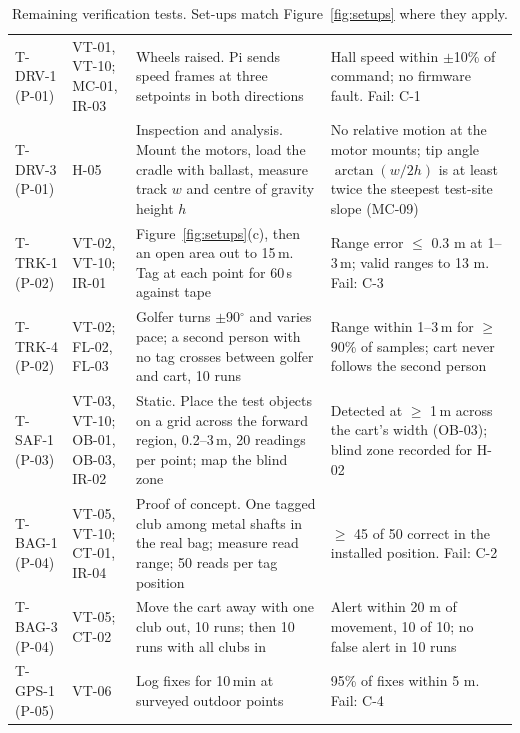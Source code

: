 \begin{table}[H]
\centering
\caption{Remaining verification tests. Set-ups match Figure~\ref{fig:setups} where they apply.}
\label{tab:tests-appendix}
\footnotesize\renewcommand{\arraystretch}{1.0}
\begin{tabularx}{\linewidth}{@{}L{0.56in} L{0.72in} Y Y@{}}
\toprule
{} &  &  &  \\
\midrule
\mbox{T-DRV-1} (P-01) & VT-01, VT-10; MC-01, IR-03 & Wheels raised. Pi sends speed frames at three setpoints in both directions & Hall speed within $\pm$10\% of command; no firmware fault. Fail: C-1 \\
\addlinespace[2pt]
\mbox{T-DRV-3} (P-01) & H-05 & Inspection and analysis. Mount the motors, load the cradle with ballast, measure track $w$ and centre of gravity height $h$ & No relative motion at the motor mounts; tip angle $\arctan(w/2h)$ is at least twice the steepest test-site slope (MC-09) \\
\addlinespace[2pt]
\mbox{T-TRK-1} (P-02) & VT-02, VT-10; IR-01 & Figure~\ref{fig:setups}(c), then an open area out to 15\,m. Tag at each point for 60\,s against tape & Range error $\le$ 0.3 m at 1--3\,m; valid ranges to 13 m. Fail: C-3 \\
\addlinespace[2pt]
\mbox{T-TRK-4} (P-02) & VT-02; FL-02, FL-03 & Golfer turns $\pm$90$^\circ$ and varies pace; a second person with no tag crosses between golfer and cart, 10 runs & Range within 1--3\,m for $\ge$ 90\% of samples; cart never follows the second person \\
\addlinespace[2pt]
\mbox{T-SAF-1} (P-03) & VT-03, VT-10; OB-01, OB-03, IR-02 & Static. Place the test objects on a grid across the forward region, 0.2--3\,m, 20 readings per point; map the blind zone & Detected at $\ge$ 1\,m across the cart's width (OB-03); blind zone recorded for H-02 \\
\addlinespace[2pt]
\mbox{T-BAG-1} (P-04) & VT-05, VT-10; CT-01, IR-04 & Proof of concept. One tagged club among metal shafts in the real bag; measure read range; 50 reads per tag position & $\ge$ 45 of 50 correct in the installed position. Fail: C-2 \\
\addlinespace[2pt]
\mbox{T-BAG-3} (P-04) & VT-05; CT-02 & Move the cart away with one club out, 10 runs; then 10 runs with all clubs in & Alert within 20 m of movement, 10 of 10; no false alert in 10 runs \\
\addlinespace[2pt]
\mbox{T-GPS-1} (P-05) & VT-06 & Log fixes for 10\,min at surveyed outdoor points & 95\% of fixes within 5 m. Fail: C-4 \\

\end{tabularx}
\end{table}
